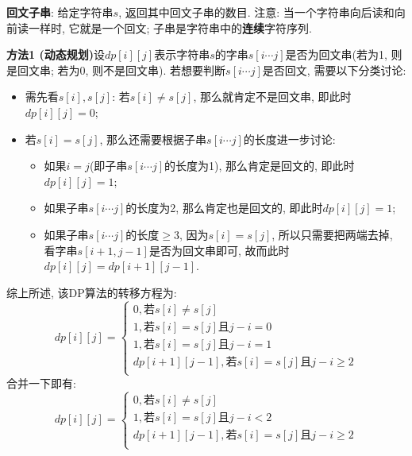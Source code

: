 \documentclass{article}
\begin{document}
\begin{homeworkProblem}
    \textbf{回文子串}: 给定字符串$s$, 返回其中回文子串的数目. 注意: 当一个字符串向后读和向前读一样时, 它就是一个回文; 子串是字符串中的\textbf{连续}字符序列.

    \solution \textbf{方法1 (动态规划)}\quad 设$dp[i][j]$表示字符串$s$的字串$s[i\cdots j]$是否为回文串(若为1, 则是回文串; 若为0, 则不是回文串). 若想要判断$s[i\cdots j]$是否回文, 需要以下分类讨论:
    \begin{itemize}
        \item 需先看$s[i],s[j]$: 若$s[i]\neq s[j]$, 那么就肯定不是回文串, 即此时$dp[i][j]=0$; 
        \item 若$s[i]=s[j]$, 那么还需要根据子串$s[i\cdots j]$的长度进一步讨论:
        \begin{itemize}
            \item 如果$i=j$(即子串$s[i\cdots j]$的长度为1), 那么肯定是回文的, 即此时$dp[i][j]=1$;
            \item 如果子串$s[i\cdots j]$的长度为2, 那么肯定也是回文的, 即此时$dp[i][j]=1$;
            \item 如果子串$s[i\cdots j]$的长度$\geq 3$, 因为$s[i]=s[j]$, 所以只需要把两端去掉, 看字串$s[i+1,j-1]$是否为回文串即可, 故而此时$dp\left[ i \right] \left[ j \right] =dp\left[ i+1 \right] \left[ j-1 \right]$.
        \end{itemize}
    \end{itemize}
    综上所述, 该DP算法的转移方程为:
    $$dp\left[ i \right] \left[ j \right] =\begin{cases}
        0, \text{若}s\left[ i \right] \ne s\left[ j \right]\\
        1, \text{若}s\left[ i \right] =s\left[ j \right] \text{且}j-i=0\\
        1, \text{若}s\left[ i \right] =s\left[ j \right] \text{且}j-i=1\\
        dp\left[ i+1 \right] \left[ j-1 \right] , \text{若}s\left[ i \right] =s\left[ j \right] \text{且}j-i\ge 2\\
    \end{cases}
    $$
    合并一下即有:
    $$dp\left[ i \right] \left[ j \right] =\begin{cases}
        0, \text{若}s\left[ i \right] \ne s\left[ j \right]\\
        1, \text{若}s\left[ i \right] =s\left[ j \right] \text{且}j-i<2\\
        dp\left[ i+1 \right] \left[ j-1 \right] , \text{若}s\left[ i \right] =s\left[ j \right] \text{且}j-i\ge 2\\

\end{cases}$$
\end{homeworkProblem}
\end{document}

